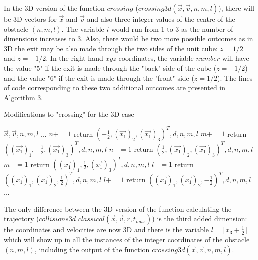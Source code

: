 \documentclass{iopart}
\begin{document}
In the 3D version of the function $crossing$ ($crossing3d(\vec{x}, \vec{v}, n, m, l)$), there will be 3D vectors for $\vec{x}$ and $\vec{v}$ and also three integer values of the centre of the obstacle $(n, m, l)$. The variable $i$ would run from 1 to 3 as the number of dimensions increases to 3. Also, there would be two more possible outcomes as in 3D the exit may be also made through the two sides of the unit cube: $z = 1/2$ and $z = -1/2$. In the right-hand $xyz$-coordinates, the variable $number$ will have the value "5" if the exit is made through the "back" side of the cube ($z = -1/2$) and the value "6" if the exit is made through the "front" side ($z = 1/2$). The lines of code corresponding to these two additional outcomes are presented in Algorithm 3.

\begin{algorithm}
\begin{algorithmic}
\caption{Modifications to "crossing" for the 3D case}
\label{alg:crossing3d}
 {$\vec{x}, \vec{v}, n, m, l$}
\State ...
        \State $n += 1$
\State return $(-\frac{1}{2}, (\vec{x_1})_2, (\vec{x_1})_3)^T, d, n, m, l$
        \State $m += 1$
        \State return $((\vec{x_1})_1, -\frac{1}{2}, (\vec{x_1})_3)^T, d, n, m, l$
        \State $n -= 1$
        \State return $(\frac{1}{2}, (\vec{x_1})_2, (\vec{x_1})_3)^T, d, n, m, l$
        \State $m -= 1$
        \State return $((\vec{x_1})_1, \frac{1}{2}, (\vec{x_1})_3)^T, d, n, m, l$
\State		$l -= 1$
\State		return $((\vec{x_1})_1, (\vec{x_1})_2, \frac{1}{2})^T, d, n, m, l$
\State		$l += 1$
\State		return $((\vec{x_1})_1, (\vec{x_1})_2, -\frac{1}{2})^T, d, n, m, l$
	\EndIf
\State ...
\EndFunction
\end{algorithmic}
\end{algorithm}
		
The only difference between the 3D version of the function calculating the trajectory ($collisions3d\_classical(\vec{x}, \vec{v}, r, t_{max})$) is the third added dimension: the coordinates and velocities are now 3D and there is the variable $l = \lfloor x_3 + \frac{1}{2} \rfloor$ which will show up in all the instances of the integer coordinates of the obstacle $(n, m, l)$, including the output of the function $crossing3d(\vec{x}, \vec{v}, n, m, l)$.
\end{document}
